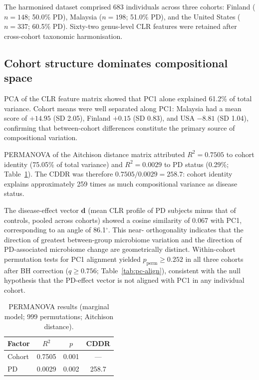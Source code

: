 \documentclass[12pt,a4paper]{article}
\begin{document}
The harmonised dataset comprised 683 individuals across three cohorts:
Finland ($n = 148$; 50.0\% PD), Malaysia ($n = 198$; 51.0\% PD), and the
United States ($n = 337$; 60.5\% PD). Sixty-two genus-level CLR features
were retained after cross-cohort taxonomic harmonisation.

\subsection{Cohort structure dominates compositional space}
\label{sec:geometry}

PCA of the CLR feature matrix showed that PC1 alone explained 61.2\% of
total variance. Cohort means were well separated along PC1: Malaysia had
a mean score of $+14.95$ (SD 2.05), Finland $+0.15$ (SD 0.83), and USA
$-8.81$ (SD 1.04), confirming that between-cohort differences constitute
the primary source of compositional variation.

PERMANOVA of the Aitchison distance matrix attributed $R^2 = 0.7505$ to
cohort identity (75.05\% of total variance) and $R^2 = 0.0029$ to PD
status (0.29\%; Table~\ref{tab:permanova}). The CDDR was therefore
$0.7505 / 0.0029 = 258.7$: cohort identity explains approximately 259 times
as much compositional variance as disease status.

The disease-effect vector $\mathbf{d}$ (mean CLR profile of PD subjects
minus that of controls, pooled across cohorts) showed a cosine similarity
of 0.067 with PC1, corresponding to an angle of 86.1$^\circ$. This near-
orthogonality indicates that the direction of greatest between-group
microbiome variation and the direction of PD-associated microbiome change
are geometrically distinct. Within-cohort permutation tests for PC1
alignment yielded $p_{\mathrm{perm}} \geq 0.252$ in all three cohorts
after BH correction ($q \geq 0.756$; Table~\ref{tab:pc-align}), consistent
with the null hypothesis that the PD-effect vector is not aligned with PC1
in any individual cohort.

\begin{table}[h]
\centering
\caption{PERMANOVA results (marginal model; 999 permutations;
Aitchison distance).}
\label{tab:permanova}
\begin{tabular}{lccc}
\toprule
Factor  & $R^2$  & $p$ & CDDR \\
\midrule
Cohort  & 0.7505 & 0.001 & --- \\
PD      & 0.0029 & 0.002 & 258.7 \\
\bottomrule
\end{tabular}
\end{table}
\end{document}
